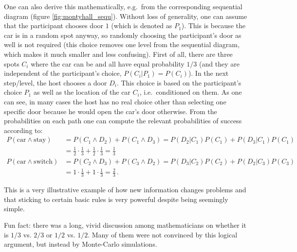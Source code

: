 \begin{ex}
One can also derive this mathematically, e.g.~from the corresponding sequential diagram (figure \ref{fig:montyhall_sequ}). Without loss of generality, one can assume that the participant chooses door $1$ (which is denoted as $P_1$). This is because the car is in a random spot anyway, so randomly choosing the participant's door as well is not required (this choice removes one level from the sequential diagram, which makes it much smaller and less confusing). First of all, there are three spots $C_i$ where the car can be and all have equal probability $1 / 3$ (and they are independent of the participant's choice, $P(C_i | P_1) = P(C_i)$). In the next step/level, the host chooses a door $D_i$. This choice is based on the participant's choice $P_1$ as well as the location of the car $C_i$, i.e.~conditioned on them. As one can see, in many cases the host has no real choice other than selecting one specific door because he would open the car's door otherwise. From the probabilities on each path one can compute the relevant probabilities of success according to:
\begin{align*}
P(\text{car} \land \text{stay}) &= P(C_1 \land D_2) + P(C_1 \land D_3) = P(D_2 | C_1) P(C_1) + P(D_3 | C_1) P(C_1)
\\
&= \frac{1}{2} \cdot \frac{1}{3} + \frac{1}{2} \cdot \frac{1}{3} = \frac{1}{3}
\\
P(\text{car} \land \text{switch}) &= P(C_2 \land D_3) + P(C_3 \land D_2) = P(D_3 | C_2) P(C_2) + P(D_2 | C_3) P(C_3)
\\
&= 1 \cdot \frac{1}{3} + 1 \cdot \frac{1}{3} = \frac{2}{3} \, .
\end{align*}

This is a very illustrative example of how new information changes problems and that sticking to certain basic rules is very powerful despite being seemingly simple.

Fun fact: there was a long, vivid discussion among mathematicians on whether it is $1 / 3$ vs. $2 / 3$ or $1 / 2$ vs. $1 / 2$. Many of them were not convinced by this logical argument, but instead by Monte-Carlo simulations.
\end{ex}




